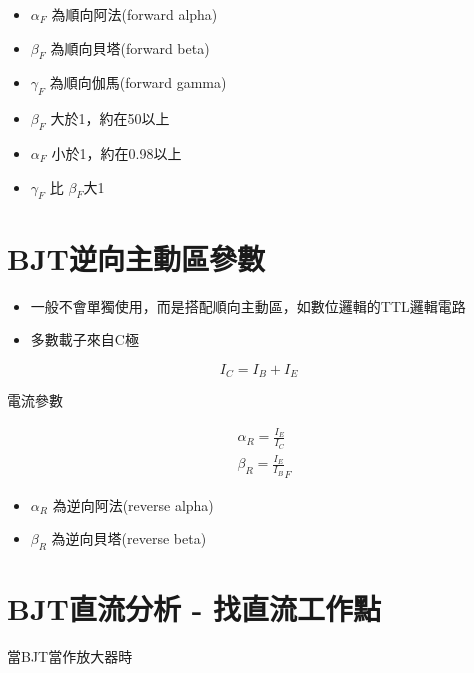 \documentclass[
]{report}
\providecommand{\tightlist}{%
  \setlength{\itemsep}{0pt}\setlength{\parskip}{0pt}}
\begin{document}
\begin{itemize}
\tightlist
\item
  \({\alpha}_F\) 為順向阿法(forward alpha)
\item
  \({\beta}_F\) 為順向貝塔(forward beta)
\item
  \({\gamma}_F\) 為順向伽馬(forward gamma)
\item
  \({\beta}_F\) 大於1，約在50以上
\item
  \({\alpha}_F\) 小於1，約在0.98以上
\item
  \({\gamma}_F\) 比 \(β_F\)大1
\end{itemize}

\hypertarget{bjtux9006ux5411ux4e3bux52d5ux5340ux53c3ux6578}{%
\section{BJT逆向主動區參數}\label{bjtux9006ux5411ux4e3bux52d5ux5340ux53c3ux6578}}

\begin{itemize}
\tightlist
\item
  一般不會單獨使用，而是搭配順向主動區，如數位邏輯的TTL邏輯電路
\item
  多數載子來自C極
\end{itemize}

\[
I_C = I_B + I_E
\]

電流參數

\begin{equation*}
\begin{split}
& {\alpha}_R = \frac{I_E}{I_C} \\
& {\beta}_R = \frac{I_E}{I_B}_F 
\end{split}
\end{equation*}

\begin{itemize}
\tightlist
\item
  \({\alpha}_R\) 為逆向阿法(reverse alpha)
\item
  \({\beta}_R\) 為逆向貝塔(reverse beta)
\end{itemize}

\hypertarget{bjtux76f4ux6d41ux5206ux6790---ux627eux76f4ux6d41ux5de5ux4f5cux9ede}{%
\section{BJT直流分析 -
找直流工作點}\label{bjtux76f4ux6d41ux5206ux6790---ux627eux76f4ux6d41ux5de5ux4f5cux9ede}}

當BJT當作放大器時
\end{document}
